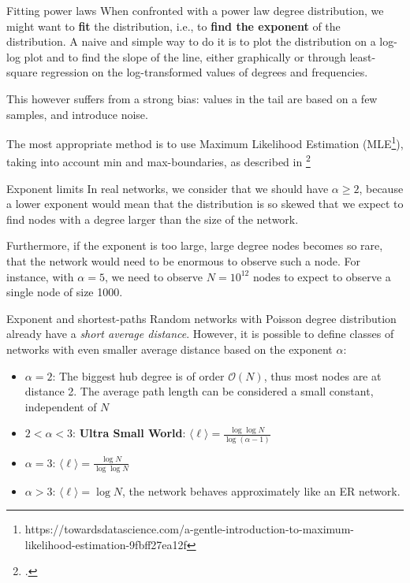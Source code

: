 \documentclass[a4paper,11pt]{book}
\begin{document}
\begin{textbox}{Fitting power laws}
When confronted with a power law degree distribution, we might want to \textbf{fit} the distribution, i.e., to \textbf{find the exponent} of the distribution. A naive and simple way to do it is to plot the distribution on a log-log plot and to find the slope of the line, either graphically or through least-square regression on the log-transformed values of degrees and frequencies. 

This however suffers from a strong bias: values in the tail are based on a few samples, and introduce noise.

The most appropriate method is to use Maximum Likelihood Estimation (MLE\footnote{https://towardsdatascience.com/a-gentle-introduction-to-maximum-likelihood-estimation-9fbff27ea12f}), taking into account min and max-boundaries, as described in \footcite{goldstein2004problems}
\end{textbox}

\begin{textbox}{Exponent limits}
In real networks, we consider that we should have $\alpha\geq2$, because a lower exponent would mean that the distribution is so skewed that we expect to find nodes with a degree larger than the size of the network.

Furthermore, if the exponent is too large, large degree nodes becomes so rare, that the network would need to be enormous to observe such a node. For instance, with $\alpha=5$, we need to observe $N=10^{12}$ nodes to expect to observe a single node of size 1000.
\end{textbox}

\begin{textbox}{Exponent and shortest-paths}
Random networks with Poisson degree distribution already have a \textit{short average distance}. However, it is possible to define classes of networks with even smaller average distance based on the exponent $\alpha$:
\begin{itemize}
    \item $\alpha=2$: The biggest hub degree is of order $\mathcal{O}(N)$, thus most nodes are at distance 2. The average path length can be considered a small constant, independent of $N$
    \item $2<\alpha<3$: \textbf{Ultra Small World}: $\langle \ell \rangle = \frac{\log \log N}{\log(\alpha-1)}$
    \item $\alpha=3$: $\langle \ell \rangle = \frac{ \log N}{\log \log N}$
    \item $\alpha>3$: $\langle \ell \rangle = \log N$, the network behaves approximately like an ER network.
\end{itemize}
\end{textbox}
\end{document}
